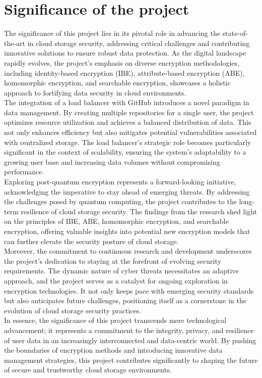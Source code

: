 \section{Significance of the project}
The significance of this project lies in its pivotal role in advancing the state-of-the-art in cloud storage
security, addressing critical challenges and contributing innovative solutions to ensure robust data
protection. As the digital landscape rapidly evolves, the project's emphasis on diverse encryption
methodologies, including identity-based encryption (IBE), attribute-based encryption (ABE),
homomorphic encryption, and searchable encryption, showcases a holistic approach to fortifying data
security in cloud environments.\\
The integration of a load balancer with GitHub introduces a novel paradigm in data management. By
creating multiple repositories for a single user, the project optimizes resource utilization and achieves
a balanced distribution of data. This not only enhances efficiency but also mitigates potential
vulnerabilities associated with centralized storage. The load balancer's strategic role becomes
particularly significant in the context of scalability, ensuring the system's adaptability to a growing
user base and increasing data volumes without compromising performance.\\
Exploring post-quantum encryption represents a forward-looking initiative, acknowledging the
imperative to stay ahead of emerging threats. By addressing the challenges posed by quantum
computing, the project contributes to the long-term resilience of cloud storage security. The findings
from the research shed light on the principles of IBE, ABE, homomorphic encryption, and searchable encryption, offering valuable insights into potential new encryption models that can further elevate
the security posture of cloud storage.\\
Moreover, the commitment to continuous research and development underscores the project's
dedication to staying at the forefront of evolving security requirements. The dynamic nature of cyber
threats necessitates an adaptive approach, and the project serves as a catalyst for ongoing exploration
in encryption technologies. It not only keeps pace with emerging security standards but also
anticipates future challenges, positioning itself as a cornerstone in the evolution of cloud storage
security practices.\\
In essence, the significance of this project transcends mere technological advancement; it represents a
commitment to the integrity, privacy, and resilience of user data in an increasingly interconnected and
data-centric world. By pushing the boundaries of encryption methods and introducing innovative data
management strategies, this project contributes significantly to shaping the future of secure and
trustworthy cloud storage environments. 

